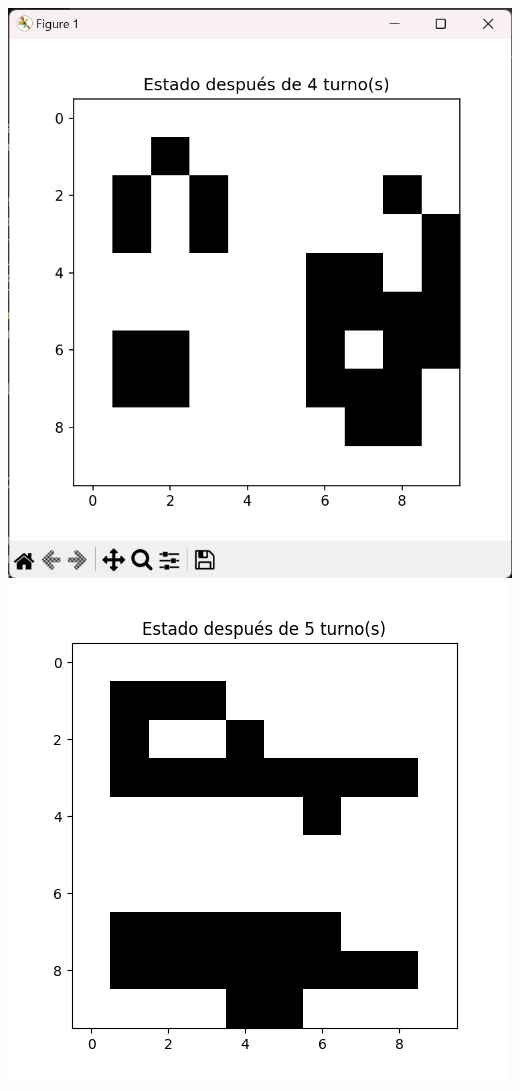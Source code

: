 \begin{enumerate}
\begin{itemize}
\begin{center}
    \includegraphics[scale=0.4]{Practica05/IMA/ejemplosJuegoVida/ejemplo 1.5.png}
    \includegraphics[scale=0.4]{Practica05/IMA/ejemplosJuegoVida/ejemplo 1.6.png}
\end{center}


\end{itemize}
\end{enumerate}
